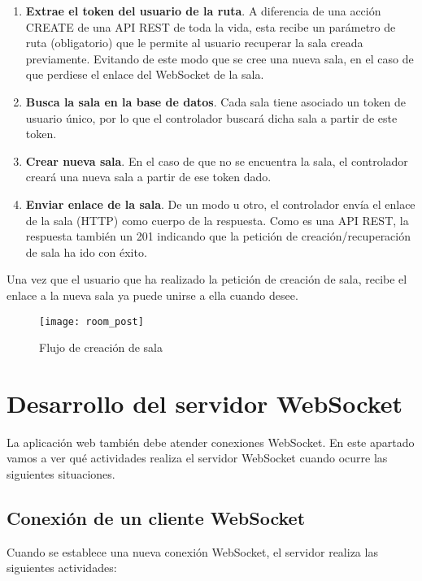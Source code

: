 \begin{enumerate}
  \item \textbf{Extrae el token del usuario de la ruta}. A diferencia de una acción CREATE de una API REST de toda la vida, esta recibe un parámetro de ruta (obligatorio) que le permite al usuario recuperar la sala creada previamente. Evitando de este modo que se cree una nueva sala, en el caso de que perdiese el enlace del WebSocket de la sala.
  \item \textbf{Busca la sala en la base de datos}. Cada sala tiene asociado un token de usuario único, por lo que el controlador buscará dicha sala a partir de este token.
  \item \textbf{Crear nueva sala}. En el caso de que no se encuentra la sala, el controlador creará una nueva sala a partir de ese token dado.
  \item \textbf{Enviar enlace de la sala}. De un modo u otro, el controlador envía el enlace de la sala (HTTP) como cuerpo de la respuesta. Como es una API REST, la respuesta también un 201 indicando que la petición de creación/recuperación de sala ha ido con éxito.
\end{enumerate}

Una vez que el usuario que ha realizado la petición de creación de sala, recibe el enlace a la nueva sala ya puede unirse a ella cuando desee.

\begin{figure}[htp!]
  \centering
  \texttt{[image: room\_post]}
  \caption{Flujo de creación de sala}
  \label{fig:room_post}
\end{figure}

\section{Desarrollo del servidor WebSocket}

La aplicación web también debe atender conexiones WebSocket. En este apartado vamos a ver qué actividades realiza el servidor WebSocket cuando ocurre las siguientes situaciones.

\subsection{Conexión de un cliente WebSocket}

Cuando se establece una nueva conexión WebSocket, el servidor realiza las siguientes actividades:

